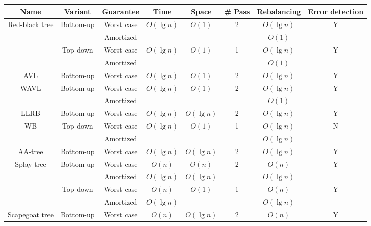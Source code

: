 \begin{table}[!t]
\begin{threeparttable}
\begin{tabular}{cccccccc}
 Name & Variant & Guarantee & Time & Space & \# Pass & Rebalancing & Error detection  \\
 \hline
 \multirow{4}{*}{Red-black tree} & \multirow{2}{*}{Bottom-up} & Worst case & \multirow{2}{*}{$O(\lg n)$} & \multirow{2}{*}{$O(1)$} & \multirow{2}{*}{2} & $O(\lg n)$\tnote{1} & \multirow{2}{*}{Y} \\
  & & Amortized & &  &  & $O(1)$ &  \\
  \cline{2-8}
  & \multirow{2}{*}{Top-down} & Worst case & \multirow{2}{*}{$O(\lg n)$} & \multirow{2}{*}{$O(1)$} & \multirow{2}{*}{1} & $O(\lg n)$ & \multirow{2}{*}{Y} \\
  & & Amortized & & &  & $O(1)$\tnote{2} & \\
  \hline
  AVL & Bottom-up & Worst case & $O(\lg n)$ & $O(1)$ & 2 & $O(\lg n)$\tnote{3} & Y \\
  \hline
  \multirow{2}{*}{WAVL} & \multirow{2}{*}{Bottom-up} & Worst case & \multirow{2}{*}{$O(\lg n)$} & \multirow{2}{*}{$O(1)$} & \multirow{2}{*}{2} & $O(\lg n)$\tnote{4} & \multirow{2}{*}{Y} \\
  & & Amortized & & & & $O(1)$ & \\
  \hline
  LLRB & Bottom-up & Worst case & $O(\lg n)$ & $O(\lg n)$ & 2 & $O(\lg n)$ & Y \\
  \hline
  \multirow{2}{*}{WB} & \multirow{2}{*}{Top-down} & Worst case & \multirow{2}{*}{$O(\lg n)$} & \multirow{2}{*}{$O(1)$} & \multirow{2}{*}{1} & $O(\lg n)$ & \multirow{2}{*}{N\tnote{5}} \\
  & & Amortized &  & & & $O(\lg n)$\tnote{6} &  \\
  \hline
  AA-tree & Bottom-up & Worst case & $O(\lg n)$ & $O(\lg n)$ & 2 & $O(\lg n)$ & Y \\
  \hline
  \multirow{4}{*}{Splay tree} & \multirow{2}{*}{Bottom-up} & Worst case & $O(n)$ & $O(n)$ & \multirow{2}{*}{2} & $O(n)$ & \multirow{2}{*}{Y} \\
  & & Amortized & $O(\lg n)$ & $O(\lg n)$ & & $O(\lg n)$ & \\
   & \multirow{2}{*}{Top-down} & Worst case & $O(n)$ & \multirow{2}{*}{$O(1)$} & \multirow{2}{*}{1} & $O(n)$ & \multirow{2}{*}{Y} \\
  & & Amortized & $O(\lg n)$ &  & & $O(\lg n)$ & \\
  \hline
  \multirow{2}{*}{Scapegoat tree} & \multirow{2}{*}{Bottom-up} & Worst case & $O(n)$ & \multirow{2}{*}{$O(\lg n)$} & \multirow{2}{*}{2} & $O(n)$ & \multirow{2}{*}{Y} \\

\end{tabular}
\end{threeparttable}
\end{table}
